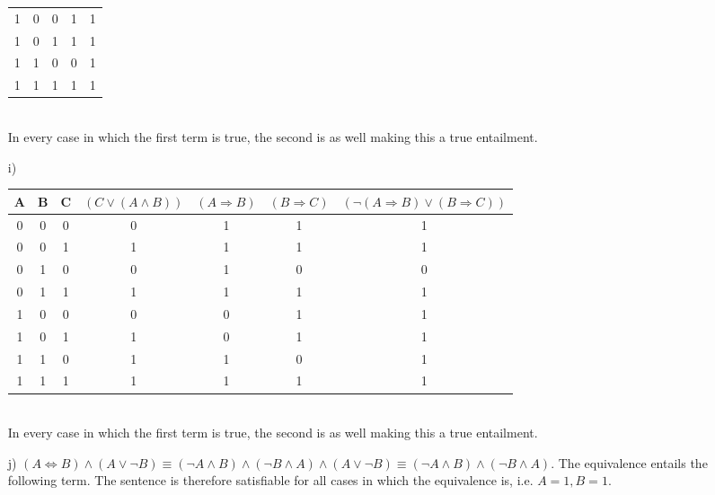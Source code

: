 \documentclass[a4paper]{article}
\begin{document}
\begin{itemize}
\begin{tabular}{c | c | c || c | c }
		1 & 0 & 0 & 1 & 1 \\
		1 & 0 & 1 & 1 & 1 \\
		1 & 1 & 0 & 0 & 1 \\
		1 & 1 & 1 & 1 & 1 \\
	\end{tabular}\\
	In every case in which the first term is true, the second is as well making this a true entailment.
	\item[i)]
	\begin{tabular}{c | c | c || c | c | c | c}
		A & B & C & $(C \lor (A \land B))$ & $(A \Rightarrow B)$ & $(B \Rightarrow C)$ & $(\neg(A \Rightarrow B) \lor (B \Rightarrow C))$ \\ \hline
		0 & 0 & 0 & 0 & 1 & 1 & 1 \\
		0 & 0 & 1 & 1 & 1 & 1 & 1\\
		0 & 1 & 0 & 0 & 1 & 0 & 0\\
		0 & 1 & 1 & 1 & 1 & 1 & 1\\
		1 & 0 & 0 & 0 & 0 & 1 & 1\\
		1 & 0 & 1 & 1 & 0 & 1 & 1\\
		1 & 1 & 0 & 1 & 1 & 0 & 1\\
		1 & 1 & 1 & 1 & 1 & 1 & 1\\
	\end{tabular}\\
	In every case in which the first term is true, the second is as well making this a true entailment.
	\item[j)] $(A \Leftrightarrow B) \land (A \lor \neg B) \equiv (\neg A \land B) \land (\neg B \land A) \land (A \lor \neg B) \equiv (\neg A \land B) \land (\neg B \land A)$. The equivalence entails the following term. The sentence is therefore satisfiable for all cases in which the equivalence is, i.e. $A = 1, B = 1$.
\end{itemize}
\end{document}
